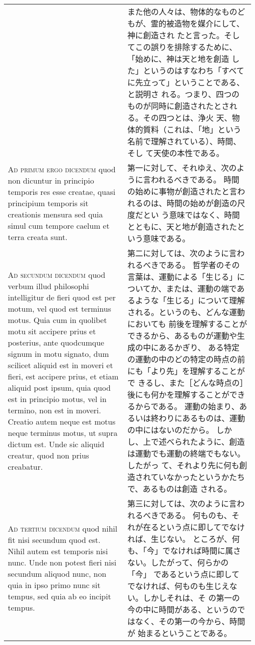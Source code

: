 \documentclass[10pt]{jsarticle} %
\begin{document}
\begin{longtable}{p{21em}p{21em}}
&
また他の人々は、物体的なものどもが、霊的被造物を媒介にして、神に創造され
 たと言った。そしてこの誤りを排除するために、「始めに、神は天と地を創造
 した」というのはすなわち「すべてに先立って」ということである、と説明さ
 れる。つまり、四つのものが同時に創造されたとされる。その四つとは、浄火
 天、物体的質料（これは、「地」という名前で理解されている）、時間、そし
 て天使の本性である。

\\


{\scshape Ad primum ergo dicendum} quod non dicuntur in
principio temporis res esse creatae, quasi principium temporis sit
creationis mensura sed quia simul cum tempore caelum et terra creata
sunt.


&

第一に対して、それゆえ、次のように言われるべきである。
時間の始めに事物が創造されたと言われるのは、時間の始めが創造の尺度だとい
 う意味ではなく、時間とともに、天と地が創造されたという意味である。

\\


{\scshape Ad secundum dicendum} quod verbum illud
philosophi intelligitur de fieri quod est per motum, vel quod est
terminus motus. Quia cum in quolibet motu sit accipere prius et
posterius, ante quodcumque signum in motu signato, dum scilicet aliquid
est in moveri et fieri, est accipere prius, et etiam aliquid post ipsum,
quia quod est in principio motus, vel in termino, non est in
moveri. Creatio autem neque est motus neque terminus motus, ut supra
dictum est. Unde sic aliquid creatur, quod non prius creabatur.


&

第二に対しては、次のように言われるべきである。
哲学者のその言葉は、運動による「生じる」についてか、または、運動の端であ
 るような「生じる」について理解される。というのも、どんな運動においても
 前後を理解することができるから、あるものが運動や生成の中にあるかぎり、
 ある特定の運動の中のどの特定の時点の前にも「より先」を理解することがで
 きるし、また［どんな時点の］後にも何かを理解することができるからである。
 運動の始まり、あるいは終わりにあるものは、運動の中にはないのだから。
しかし、上で述べられたように、創造は運動でも運動の終端でもない。したがっ
 て、それより先に何も創造されていなかったというかたちで、あるものは創造
 される。

\\


{\scshape Ad tertium dicendum} quod nihil fit nisi
secundum quod est. Nihil autem est temporis nisi nunc. Unde non potest
fieri nisi secundum aliquod nunc, non quia in ipso primo nunc sit
tempus, sed quia ab eo incipit tempus.

&

第三に対しては、次のように言われるべきである。
何ものも、それが在るという点に即してでなければ、生じない。
ところが、何も、「今」でなければ時間に属さない。したがって、何らかの「今」
 であるという点に即してでなければ、何ものも生じえない。しかしそれは、そ
 の第一の今の中に時間がある、というのではなく、その第一の今から、時間が
 始まるということである。

\end{longtable}
\end{document}
